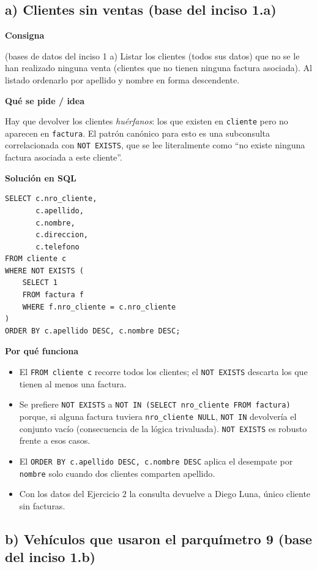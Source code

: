 \documentclass[11pt,a4paper]{article}
\newcommand{\itemcabecera}[1]{\noindent\textbf{#1}\par\medskip}
\newcommand{\bloqueConsigna}{\itemcabecera{Consigna}}
\newcommand{\bloqueIdea}{\itemcabecera{Qu\'e se pide / idea}}
\newcommand{\bloqueSolucion}{\itemcabecera{Soluci\'on en SQL}}
\newcommand{\bloquePorque}{\itemcabecera{Por qu\'e funciona}}
\begin{document}
\subsection{a) Clientes sin ventas (base del inciso 1.a)}

\bloqueConsigna

(bases de datos del inciso 1 a) Listar los clientes (todos sus datos) que no se le han realizado ninguna venta (clientes que no tienen ninguna factura asociada). Al listado ordenarlo por apellido y nombre en forma descendente.

\bloqueIdea

Hay que devolver los clientes \emph{huérfanos}: los que existen en \texttt{cliente} pero no aparecen en \texttt{factura}. El patrón canónico para esto es una subconsulta correlacionada con \texttt{NOT EXISTS}, que se lee literalmente como ``no existe ninguna factura asociada a este cliente''.

\bloqueSolucion

\begin{lstlisting}
SELECT c.nro_cliente,
       c.apellido,
       c.nombre,
       c.direccion,
       c.telefono
FROM cliente c
WHERE NOT EXISTS (
    SELECT 1
    FROM factura f
    WHERE f.nro_cliente = c.nro_cliente
)
ORDER BY c.apellido DESC, c.nombre DESC;
\end{lstlisting}

\bloquePorque

\begin{itemize}
    \item El \texttt{FROM cliente c} recorre todos los clientes; el \texttt{NOT EXISTS} descarta los que tienen al menos una factura.
    \item Se prefiere \texttt{NOT EXISTS} a \texttt{NOT IN (SELECT nro\_cliente FROM factura)} porque, si alguna factura tuviera \texttt{nro\_cliente NULL}, \texttt{NOT IN} devolvería el conjunto vacío (consecuencia de la lógica trivaluada). \texttt{NOT EXISTS} es robusto frente a esos casos.
    \item El \texttt{ORDER BY c.apellido DESC, c.nombre DESC} aplica el desempate por \texttt{nombre} solo cuando dos clientes comparten apellido.
    \item Con los datos del Ejercicio 2 la consulta devuelve a Diego Luna, único cliente sin facturas.
\end{itemize}

\subsection{b) Vehículos que usaron el parquímetro 9 (base del inciso 1.b)}
\end{document}
